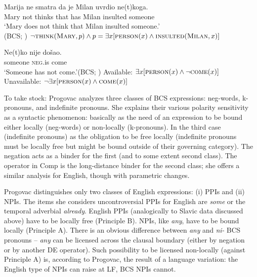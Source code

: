 \documentclass[output=paper,colorlinks,citecolor=brown]{langscibook}
\begin{document}
\begin{enumerate}
\ea\label{68bcd014}\ea\gll Marija ne smatra da je Milan uvrdio ne(t)koga.\\
Mary not thinks that has Milan insulted someone\\
\glt `Mary does not think that Milan insulted someone.'\\\hfill (BCS; \citealt{progovac1994negative})
\ex $\neg \textsc{think}(\textsc{Mary},p) \wedge p= \exists x[\textsc{person}(x) \wedge \textsc{insulted}(\textsc{Milan},x)]$
\z
\z

\ea\label{a67c72bd}\ea\gll Ne(t)ko nije došao.\\
someone \textsc{neg}.is come\\
\glt `Someone has not come.'\hfill (BCS; \citealt{progovac1994negative})
\ex
\ea Available: $\exists x[\textsc{person}(x) \wedge \neg \textsc{come}(x)]$
\ex Unavailable: $\neg\exists x[\textsc{person}(x) \wedge \textsc{come}(x)]$
\z\z\z

\end{enumerate}

\noindent To take stock: Progovac analyzes three classes of BCS expressions: neg-words, k-pronouns, and indefinite pronouns. She explains their various polarity sensitivity as a syntactic phenomenon: basically as the need of an expression to be bound either locally (neg-words) or non-locally (k-pronouns). In the third case (indefinite pronouns) as the obligation to be free locally (indefinite pronouns must be locally free but might be bound outside of their governing category). The negation acts as a binder for the first (and to some extent second class). The operator in Comp is the long-distance binder for the second class; she offers a similar analysis for English, though with parametric changes.

Progovac distinguishes only two classes of English expressions: (i) PPIs and (ii) NPIs. The items she considers uncontroversial PPIs for English are \emph{some} or the temporal adverbial \emph{already}. English PPIs (analogically to Slavic data discussed above) have to be locally free (Principle B). NPIs, like \emph{any}, have to be bound locally (Principle A). There is an obvious difference between \emph{any} and \emph{ni-} BCS pronouns -- \emph{any} can be licensed across the clausal boundary (either by negation or by another DE operator). Such possibility to be licensed non-locally (against Principle A) is, according to Progovac, the result of a language variation: the English type of NPIs can raise at LF, BCS NPIs cannot.
\end{document}
